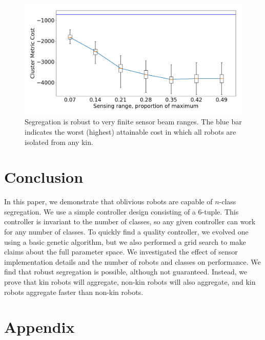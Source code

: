 \documentclass[conference]{IEEEtran}
\begin{document}
    \begin{figure}
      \centering
      \includegraphics[width=1\linewidth]{./images/beam_length.png}
      \caption{Segregation is robust to very finite sensor beam ranges. The blue bar indicates the worst (highest) attainable cost in which all robots are isolated from any kin.}
      \label{fig:beam_range}
    \end{figure}

\section{Conclusion}

  In this paper, we demonstrate that oblivious robots are capable of $n$-class segregation. We use a simple controller design consisting of a 6-tuple. This controller is invariant to the number of classes, so any given controller can work for any number of classes. To quickly find a quality controller, we evolved one using a basic genetic algorithm, but we also performed a grid search to make claims about the full parameter space. We investigated the effect of sensor implementation details and the number of robots and classes on performance. We find that robust segregation is possible, although not guaranteed. Instead, we prove that kin robots will aggregate, non-kin robots will also aggregate, and kin robots aggregate faster than non-kin robots.




\onecolumn
\appendix
\section{Appendix}
\end{document}
